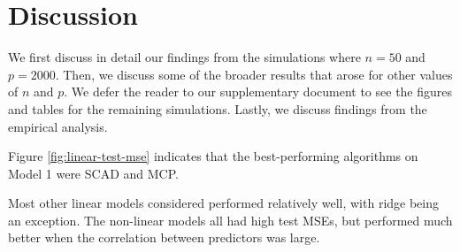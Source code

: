 \documentclass{article}
\begin{document}

	
	\newpage
	\section{Discussion}\label{sec:discussion}
	
	We first discuss in detail our findings from the simulations where $n = 50$ and $p = 2000$. Then, we discuss some of the broader results that arose for other values of $n$ and $p$. We defer the reader to our supplementary document to see the figures and tables for the remaining simulations. Lastly, we discuss findings from the empirical analysis.
	
	Figure \ref{fig:linear-test-mse} indicates that the best-performing algorithms on Model 1 were SCAD and MCP. 

	Most other linear models considered performed relatively well, with ridge being an exception. The non-linear models all had high test MSEs, but performed much better when the correlation between predictors was large.
	
\end{document}
